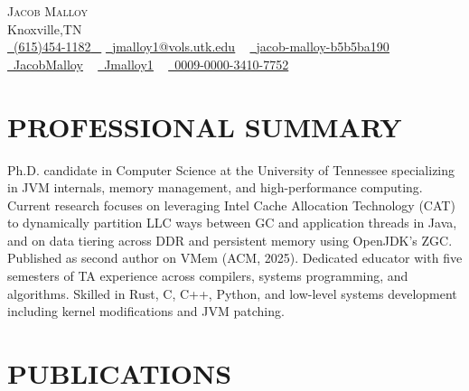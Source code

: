 \documentclass[letterpaper,6pt]{article}
\begin{document}

\begin{center}
	{\Huge \scshape Jacob Malloy} \\ \vspace{1pt}
	Knoxville,TN \\ \vspace{1pt}
	\small \href{tel:+16154541182}{ \raisebox{-0.1\height}\faPhone\ \underline{(615)454-1182} ~} \href{mailto:jmalloy1@vols.utk.edu}{\raisebox{-0.2\height}\faEnvelope\  \underline{jmalloy1@vols.utk.edu}} ~
	\href{https://www.linkedin.com/in/jacob-malloy-b5b5ba190/}{\raisebox{-0.2\height}\faLinkedin\ \underline{jacob-malloy-b5b5ba190}}  ~
	\href{https://github.com/jacobmalloy}{\raisebox{-0.2\height}\faGithub\ \underline{JacobMalloy}} ~
	\href{https://gitlab.com/jmalloy1}{\raisebox{-0.2\height}\faGitlab\ \underline{Jmalloy1}} ~
	\href{https://orcid.org/0009-0000-3410-7752}{\raisebox{-0.2\height}\faOrcid\ \underline{0009-0000-3410-7752}} ~
	\vspace{-8pt}
\end{center}

\section{PROFESSIONAL SUMMARY}
Ph.D. candidate in Computer Science at the University of Tennessee specializing in JVM internals, memory management, and high-performance computing. Current research focuses on leveraging Intel Cache Allocation Technology (CAT) to dynamically partition LLC ways between GC and application threads in Java, and on data tiering across DDR and persistent memory using OpenJDK’s ZGC. Published as second author on VMem (ACM, 2025). Dedicated educator with five semesters of TA experience across compilers, systems programming, and algorithms. Skilled in Rust, C, C++, Python, and low-level systems development including kernel modifications and JVM patching.

\section{PUBLICATIONS}
\resumeSubHeadingListStart
{}
\resumeItemListStart
{}
\resumeItemListEnd
\resumeSubHeadingListEnd
\vspace{-12pt}
\end{document}

